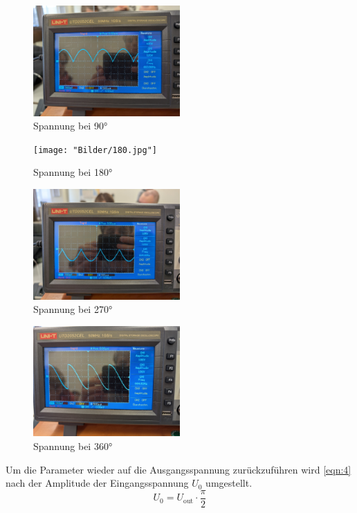 \begin{figure}
    \caption{Spannung bei 90$\unit{\degree}$}
    \label{fig:12}
    \centering
    \includegraphics[width=0.5\textwidth]{"Bilder/90.jpg"}
\end{figure}
\begin{figure}
    \caption{Spannung bei 180$\unit{\degree}$}
    \label{fig:12}
    \centering
    \texttt{[image: "Bilder/180.jpg"]}
\end{figure}
\begin{figure}
    \caption{Spannung bei 270$\unit{\degree}$}
    \label{fig:12}
    \centering
    \includegraphics[width=0.5\textwidth]{"Bilder/270.jpg"}
\end{figure}
\begin{figure}
    \caption{Spannung bei 360$\unit{\degree}$}
    \label{fig:12}
    \centering
    \includegraphics[width=0.5\textwidth]{"Bilder/360.jpg"}
\end{figure}

\noindent Um die Parameter wieder auf die Ausgangsspannung zurückzuführen wird 
\autoref{eqn:4} nach der Amplitude der Eingangsspannung $U_0$ umgestellt.
\begin{equation}
    U_0 = U_{\text{out}} \cdot \frac{\pi}{2} 
\end{equation}







